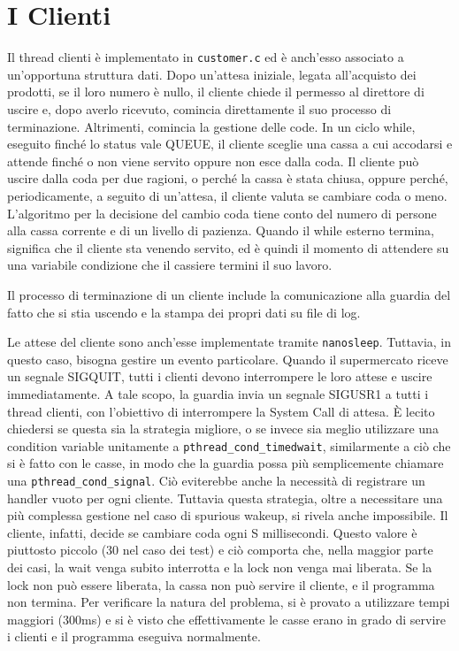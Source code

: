 \documentclass[a4paper,11pt,twoside] {article}
\begin{document}
\section*{I Clienti}

Il thread clienti è implementato in \lstinline{customer.c} ed è anch'esso associato a un'opportuna struttura dati. Dopo un'attesa iniziale, legata all'acquisto dei prodotti, se il loro numero è nullo, il cliente chiede il permesso al direttore di uscire e, dopo averlo ricevuto, comincia direttamente il suo processo di terminazione. Altrimenti, comincia la gestione delle code. In un ciclo while, eseguito finché lo status vale QUEUE, il cliente sceglie una cassa a cui accodarsi e attende finché o non viene servito oppure non esce dalla coda. Il cliente può uscire dalla coda per due ragioni, o perché la cassa è stata chiusa, oppure perché, periodicamente, a seguito di un'attesa, il cliente valuta se cambiare coda o meno. L'algoritmo per la decisione del cambio coda tiene conto del numero di persone alla cassa corrente e di un livello di pazienza.
Quando il while esterno termina, significa che il cliente sta venendo servito, ed è quindi il momento di attendere su una variabile condizione che il cassiere termini il suo lavoro.

Il processo di terminazione di un cliente include la comunicazione alla guardia del fatto che si stia uscendo e la stampa dei propri dati su file di log.

Le attese del cliente sono anch'esse implementate tramite \lstinline{nanosleep}. Tuttavia, in questo caso, bisogna gestire un evento particolare. Quando il supermercato riceve un segnale SIGQUIT, tutti i clienti devono interrompere le loro attese e uscire immediatamente. A tale scopo, la guardia invia un segnale SIGUSR1 a tutti i thread clienti, con l'obiettivo di interrompere la System Call di attesa. È lecito chiedersi se questa sia la strategia migliore, o se invece sia meglio utilizzare una condition variable unitamente a \lstinline{pthread_cond_timedwait}, similarmente a ciò che si è fatto con le casse, in modo che la guardia possa più semplicemente chiamare una \lstinline{pthread_cond_signal}. Ciò eviterebbe anche la necessità di registrare un handler vuoto per ogni cliente. Tuttavia questa strategia, oltre a necessitare una più complessa gestione nel caso di spurious wakeup, si rivela anche impossibile. Il cliente, infatti, decide se cambiare coda ogni S millisecondi. Questo valore è piuttosto piccolo (30 nel caso dei test) e ciò comporta che, nella maggior parte dei casi, la wait venga subito interrotta e la lock non venga mai liberata. Se la lock non può essere liberata, la cassa non può servire il cliente, e il programma non termina. Per verificare la natura del problema, si è provato a utilizzare tempi maggiori (300ms) e si è visto che effettivamente le casse erano in grado di servire i clienti e il programma eseguiva normalmente.
\end{document}
